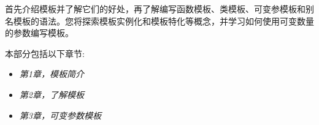 首先介绍模板并了解它们的好处，再了解编写函数模板、类模板、可变参模板和别名模板的语法。您将探索模板实例化和模板特化等概念，并学习如何使用可变数量的参数编写模板。

本部分包括以下章节:

\begin{itemize}
\item
\textit{第1章，模板简介}

\item
\textit{第2章，了解模板}

\item
\textit{第3章，可变参数模板}
\end{itemize}